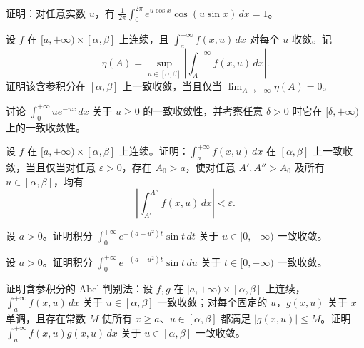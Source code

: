 \noindent\begin{minipage}{\textwidth}
证明：对任意实数 $u$，有 $\displaystyle\frac1{2\pi}\int_0^{2\pi}e^{u\cos x}\cos(u\sin x)\,dx=1$。
\end{minipage}\par\vfill
\newpage
\noindent\begin{minipage}{\textwidth}
设 $f$ 在 $[a,+\infty)\times[\alpha,\beta]$ 上连续，且 $\int_a^{+\infty}f(x,u)\,dx$ 对每个 $u$ 收敛。记\[\eta(A)=\sup_{u\in[\alpha,\beta]}\left|\int_A^{+\infty}f(x,u)\,dx\right|.\]证明该含参积分在 $[\alpha,\beta]$ 上一致收敛，当且仅当 $\lim_{A\to+\infty}\eta(A)=0$。
\end{minipage}\par\vfill
\noindent\begin{minipage}{\textwidth}
讨论 $\displaystyle\int_0^{+\infty}ue^{-ux}\,dx$ 关于 $u\ge0$ 的一致收敛性，并考察任意 $\delta>0$ 时它在 $[\delta,+\infty)$ 上的一致收敛性。
\end{minipage}\par\vfill
\noindent\begin{minipage}{\textwidth}
设 $f$ 在 $[a,+\infty)\times[\alpha,\beta]$ 上连续。证明：$\int_a^{+\infty}f(x,u)\,dx$ 在 $[\alpha,\beta]$ 上一致收敛，当且仅当对任意 $\varepsilon>0$，存在 $A_0>a$，使对任意 $A',A''>A_0$ 及所有 $u\in[\alpha,\beta]$，均有\[\left|\int_{A'}^{A''}f(x,u)\,dx\right|<\varepsilon.\]
\end{minipage}\par\vfill
\newpage
\noindent\begin{minipage}{\textwidth}
设 $a>0$。证明积分 $\displaystyle\int_0^{+\infty}e^{-(a+u^2)t}\sin t\,dt$ 关于 $u\in[0,+\infty)$ 一致收敛。
\end{minipage}\par\vfill
\noindent\begin{minipage}{\textwidth}
设 $a>0$。证明积分 $\displaystyle\int_0^{+\infty}e^{-(a+u^2)t}\sin t\,du$ 关于 $t\in[0,+\infty)$ 一致收敛。
\end{minipage}\par\vfill
\noindent\begin{minipage}{\textwidth}
证明含参积分的 Abel 判别法：设 $f,g$ 在 $[a,+\infty)\times[\alpha,\beta]$ 上连续，$\int_a^{+\infty}f(x,u)\,dx$ 关于 $u\in[\alpha,\beta]$ 一致收敛；对每个固定的 $u$，$g(x,u)$ 关于 $x$ 单调，且存在常数 $M$ 使所有 $x\ge a$、$u\in[\alpha,\beta]$ 都满足 $|g(x,u)|\le M$。证明 $\int_a^{+\infty}f(x,u)g(x,u)\,dx$ 关于 $u\in[\alpha,\beta]$ 一致收敛。
\end{minipage}\par\vfill
